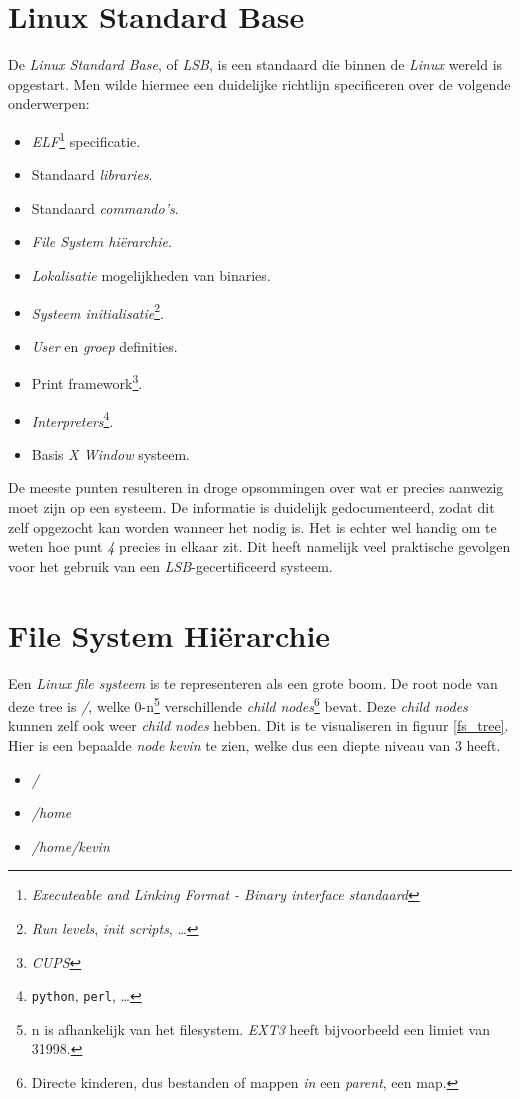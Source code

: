 \section{Linux Standard Base}
De \emph{Linux Standard Base}, of \emph{LSB}\cite{bib.lsb}, is een standaard die binnen de \emph{Linux} wereld is opgestart. Men wilde hiermee een duidelijke richtlijn specificeren over de volgende onderwerpen:
\begin{itemize}
  \item[1.] \emph{ELF}\footnote{\emph{Executeable and Linking Format - Binary interface standaard}} specificatie.
  \item[2.] Standaard \emph{libraries}. 
  \item[3.] Standaard \emph{commando's}. 
  \item[4.] \emph{File System hi\"{e}rarchie}. 
  \item[5.] \emph{Lokalisatie} mogelijkheden van binaries.
  \item[6.] \emph{Systeem initialisatie}\footnote{\emph{Run levels}, \emph{init scripts}, \ldots}.
  \item[7.] \emph{User} en \emph{groep} definities.
  \item[8.] Print framework\footnote{\emph{CUPS}}.
  \item[9.] \emph{Interpreters}\footnote{\texttt{python}, \texttt{perl}, \ldots}.
  \item[10.] Basis \emph{X Window} systeem.
\end{itemize}
De meeste punten resulteren in droge opsommingen over wat er precies aanwezig moet zijn op een systeem. De informatie is duidelijk gedocumenteerd, zodat dit zelf opgezocht kan worden wanneer het nodig is. Het is echter wel handig om te weten hoe punt \emph{4} precies in elkaar zit. Dit heeft namelijk veel praktische gevolgen voor het gebruik van een \emph{LSB}-gecertificeerd systeem. 

\section{File System Hi\"{e}rarchie}
Een \emph{Linux} \emph{file systeem} is te representeren als een grote boom. De root node van deze tree is \emph{/}, welke 0-n\footnote{n is afhankelijk van het filesystem. \emph{EXT3} heeft bijvoorbeeld een limiet van 31998.} verschillende \emph{child nodes}\footnote{Directe kinderen, dus bestanden of mappen \emph{in} een \emph{parent}, een map.} bevat. Deze \emph{child nodes} kunnen zelf ook weer \emph{child nodes} hebben. Dit is te visualiseren in figuur \ref{fs_tree}. Hier is een bepaalde \emph{node} \emph{kevin} te zien, welke dus een diepte niveau van 3 heeft.
\begin{itemize}
  \item[1.] \emph{/}
  \item[2.] \emph{/home}
  \item[3.] \emph{/home/kevin}
\end{itemize}

